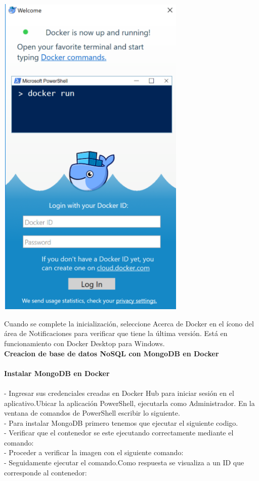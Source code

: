 \documentclass[twoside,onecolumn]{article}
\begin{document}
\begin{flushright}
\begin{itemize}
\begin{center}
		\includegraphics[width=9cm]{./Imagenes/n3.png}
\end{center}	
Cuando se complete la inicialización, seleccione Acerca de Docker en el ícono del área de Notificaciones para verificar que tiene la última versión.
Está en funcionamiento con Docker Desktop para Windows.
\textbf{}\\

\textbf{Creacion de base de datos NoSQL con MongoDB en Docker}\\

\textbf{}\\
\textbf{Instalar MongoDB en Docker}\\
\textbf{}\\
- Ingresar sus credenciales creadas en Docker Hub para iniciar sesión en el aplicativo.Ubicar la aplicación PowerShell, ejecutarla como Administrador. En la ventana de comandos de PowerShell escribir lo siguiente.
\textbf{}\\

- Para instalar MongoDB primero tenemos que ejecutar el siguiente codigo.
\textbf{}\\
- Verificar que el contenedor se este ejecutando correctamente mediante el comando:
\textbf{}\\
- Proceder a verificar la imagen con el siguiente comando:
\textbf{}\\
- Seguidamente ejecutar el comando.Como respuesta se visualiza a un ID que corresponde al contenedor:
\textbf{}\\


\end{itemize}
\end{flushright}
\end{document}
